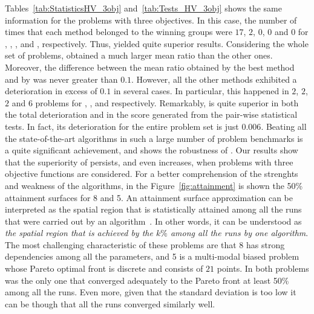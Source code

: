 Tables~\ref{tab:StatisticsHV_3obj} and~\ref{tab:Tests_HV_3obj} shows the same information for the problems with three objectives.
%
In this case, the number of times that each method belonged to the winning groups were $17$, $2$, $0$, $0$ and $0$ 
for \AVSDMOEAD{}, \RMOEA{}, \MOEADDE{}, \NSGAIII{} and \NSGAII{}, respectively.
%
Thus, \AVSDMOEAD{} yielded quite superior results.
%
Considering the whole set of problems, \AVSDMOEAD{} obtained a much larger mean \HV{} ratio than the other ones.
%
Moreover, the difference between the mean \HV{} ratio obtained by the best method and by \AVSDMOEAD{} was never greater than $0.1$.
%
However, all the other methods exhibited a deterioration in excess of $0.1$ in several cases.
%
In particular, this happened in $2$, $2$, $2$ and $6$ problems for \MOEADDE{}, \RMOEA{}, \NSGAIII{} and \NSGAII{} respectively.
%
Remarkably, \AVSDMOEAD{} is quite superior in both the total deterioration and in the score generated from the pair-wise
statistical tests.
%
In fact, its deterioration for the entire problem set is just $0.006$.
%
Beating all the state-of-the-art algorithms in such a large number of problem benchmarks is a quite significant achievement, and shows
the robustness of \AVSDMOEAD{}.
%
Our results show that the superiority of \AVSDMOEAD{} persists, and even increases, when 
problems with three objective functions are considered.
%
For a better comprehension of the strenghts and weakness of the algorithms, in the Figure~\ref{fig:attainment} is shown the 50\% attainment surfaces for \WFG{}8 and \UF{}5.
%
An attainment surface approximation can be interpreted as the spatial region that is statistically attained among all the runs that were carried out by an algorithm~\cite{knowles2005summary, fonseca1996performance}.
%
In other words, it can be understood as \textit{the spatial region that is achieved by the $k\%$ among all the runs by one algorithm}.
%
The most challenging characteristic of these problems are that \WFG{}8 has strong dependencies among all the parameters, and \UF{}5 is a multi-modal biased problem whose Pareto optimal front is discrete and consists of $21$ points.
%
In both problems \AVSDMOEAD{} was the only one that converged adequately to the Pareto front at least 50\% among all the runs.
%
Even more, given that the standard deviation is too low it can be though that all the runs converged similarly well.
%



